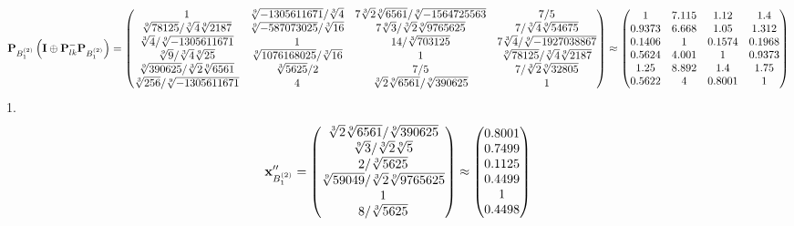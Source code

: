 \documentclass[10pt,a4paper]{article}
\begin{document}
	\[
		\bold{P}_{B_1^{(2)}}\left(\bold{I} \oplus \bold{P}_{lk}^{-}\bold{P}_{B_1^{(2)}}\right) = 
		\begin{pmatrix}
			{1}{} & {\sqrt[9]{-1305611671}} / {\sqrt[3]{4}} & {{7}\sqrt[3]{2}\sqrt[9]{6561}} / {\sqrt[9]{-1564725563}} & {{7}} / {{5}} \\
			{\sqrt[9]{78125}} / {\sqrt[3]{4}\sqrt[9]{2187}} & {\sqrt[9]{-587073025}} / {\sqrt[3]{16}} & {{7}\sqrt[9]{3}} / {\sqrt[3]{2}\sqrt[9]{9765625}} & {{7}} / {\sqrt[3]{4}\sqrt[9]{54675}} \\
			{\sqrt[3]{4}} / {\sqrt[9]{-1305611671}} & {1}{} & {{14}} / {\sqrt[3]{703125}} & {{7}\sqrt[3]{4}} / {\sqrt[9]{-1927038867}} \\
			{\sqrt[9]{9}} / {\sqrt[3]{4}\sqrt[9]{25}} & {\sqrt[9]{1076168025}} / {\sqrt[3]{16}} & {1}{} & {\sqrt[9]{78125}} / {\sqrt[3]{4}\sqrt[9]{2187}} \\
			{\sqrt[9]{390625}} / {\sqrt[3]{2}\sqrt[9]{6561}} & {\sqrt[3]{5625}} / {{2}} & {{7}} / {{5}} & {{7}} / {\sqrt[3]{2}\sqrt[9]{32805}} \\
			{\sqrt[3]{256}} / {\sqrt[9]{-1305611671}} & {{4}}{} & {\sqrt[3]{2}\sqrt[9]{6561}} / {\sqrt[9]{390625}} & {1}{} \\
		\end{pmatrix}
		\approx
		\begin{pmatrix}
			1        & 7.115    & 1.12     & 1.4      \\
			0.9373   & 6.668    & 1.05     & 1.312    \\
			0.1406   & 1        & 0.1574   & 0.1968   \\
			0.5624   & 4.001    & 1        & 0.9373   \\
			1.25     & 8.892    & 1.4      & 1.75     \\
			0.5622   & 4        & 0.8001   & 1        \\
		\end{pmatrix}
	\]
	1.
	\[
		\bold{x}''_{B_1^{(2)}} = 
		\begin{pmatrix}
			{\sqrt[3]{2}\sqrt[9]{6561}} / {\sqrt[9]{390625}} \\
			{\sqrt[9]{3}} / {\sqrt[3]{2}\sqrt[9]{5}} \\
			{{2}} / {\sqrt[3]{5625}} \\
			{\sqrt[9]{59049}} / {\sqrt[3]{2}\sqrt[9]{9765625}} \\
			{1}{} \\
			{{8}} / {\sqrt[3]{5625}} \\
		\end{pmatrix}
		\approx
		\begin{pmatrix}
			0.8001   \\
			0.7499   \\
			0.1125   \\
			0.4499   \\
			1        \\
			0.4498   \\
		\end{pmatrix}
	\]
\end{document}
